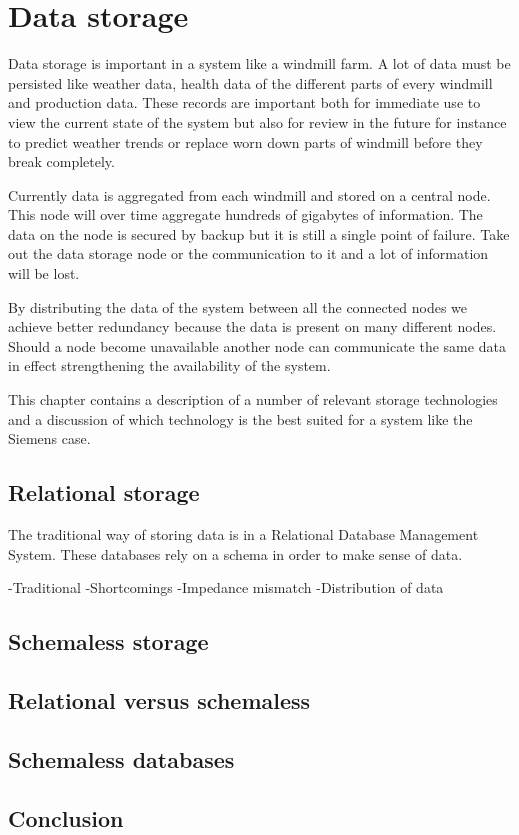 \chapter{Data storage}
Data storage is important in a system like a windmill farm.
A lot of data must be persisted like weather data, health data of the different parts of every windmill and production data.
These records are important both for immediate use to view the current state of the system but also for review in the future for instance to predict weather trends or replace worn down parts of windmill before they break completely.

Currently data is aggregated from each windmill and stored on a central node.
This node will over time aggregate hundreds of gigabytes of information.
The data on the node is secured by backup but it is still a single point of failure.
Take out the data storage node or the communication to it and a lot of information will be lost.

By distributing the data of the system between all the connected nodes we achieve better redundancy because the data is present on many different nodes.
Should a node become unavailable another node can communicate the same data in effect strengthening the availability of the system.

This chapter contains a description of a number of relevant storage technologies and a discussion of which technology is the best suited for a system like the Siemens case.

\section{Relational storage}
The traditional way of storing data is in a Relational Database Management System.
These databases rely on a schema in order to make sense of data.


-Traditional
-Shortcomings
	-Impedance mismatch
	-Distribution of data

\section{Schemaless storage}

\section{Relational versus schemaless}

\section{Schemaless databases}

\section{Conclusion}